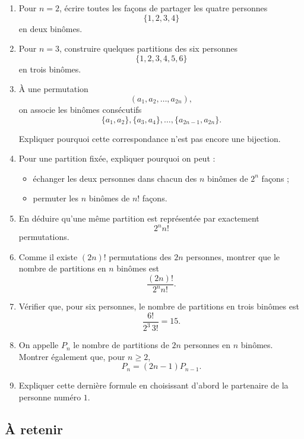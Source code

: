 \begin{enumerate}
    \item Pour \(n=2\), écrire toutes les façons de partager les quatre
    personnes
    \[
    \{1,2,3,4\}
    \]
    en deux binômes.

    \item Pour \(n=3\), construire quelques partitions des six personnes
    \[
    \{1,2,3,4,5,6\}
    \]
    en trois binômes.

    \item À une permutation
    \[
    (a_1,a_2,\dots,a_{2n}),
    \]
    on associe les binômes consécutifs
    \[
    \{a_1,a_2\},
    \{a_3,a_4\},
    \dots,
    \{a_{2n-1},a_{2n}\}.
    \]

    Expliquer pourquoi cette correspondance n'est pas encore une bijection.

    \item Pour une partition fixée, expliquer pourquoi on peut :
    \begin{itemize}
        \item échanger les deux personnes dans chacun des \(n\) binômes de
        \(2^n\) façons ;
        \item permuter les \(n\) binômes de \(n!\) façons.
    \end{itemize}

    \item En déduire qu'une même partition est représentée par exactement
    \[
    2^n n!
    \]
    permutations.

    \item Comme il existe \((2n)!\) permutations des \(2n\) personnes,
    montrer que le nombre de partitions en \(n\) binômes est
    \[
    \boxed{
    \frac{(2n)!}{2^n n!}.
    }
    \]

    \item Vérifier que, pour six personnes, le nombre de partitions en trois
    binômes est
    \[
    \frac{6!}{2^3\,3!}=15.
    \]

    \item On appelle \(P_n\) le nombre de partitions de \(2n\) personnes en
    \(n\) binômes. Montrer également que, pour \(n\ge 2\),
    \[
    P_n=(2n-1)P_{n-1}.
    \]

    \item Expliquer cette dernière formule en choisissant d'abord le partenaire
    de la personne numéro \(1\).
\end{enumerate}

\subsection{À retenir}

